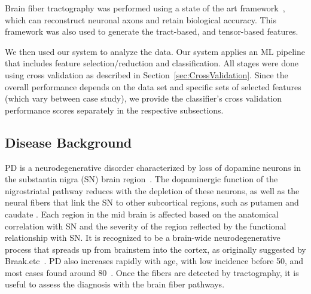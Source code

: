 Brain fiber tractography was performed using a state of the art framework~\cite{SMITH20121924}, which can reconstruct neuronal axons and retain biological accuracy. This framework was also used to generate the tract-based, and tensor-based features. 

We then used our system to analyze the data. Our system applies an ML pipeline that includes feature selection/reduction and classification. All stages were done using cross validation as described in
Section~\ref{sec:CrossValidation}. Since the overall performance depends on the data set and specific sets of selected features (which vary between case study), we provide the classifier's cross validation performance scores separately in the respective subsections.


\subsection{Disease Background}

\noindent PD is a neurodegenerative disorder characterized by loss of dopamine neurons in the substantia nigra (SN) brain region~\cite{prakash2012asymmetrical}. The dopaminergic function of the nigrostriatal pathway reduces with the depletion of these neurons, as well as the neural fibers that link the SN to other subcortical regions, such as putamen and caudate \cite{zhang2015diffusion}. Each region in the mid brain is affected based on the anatomical correlation with SN and the severity of the region reflected by the functional relationship with SN. %
It is recognized to be a brain-wide neurodegenerative process that spreads up from brainstem into the cortex, as originally suggested by Braak.etc~\cite{yau2018network}. %
PD also increases rapidly with age, with low incidence before 50, and most cases found around 80~\cite{ASCHERIO20161257}. Once the fibers are detected by tractography, it is useful to assess the diagnosis with the brain fiber pathways. 

